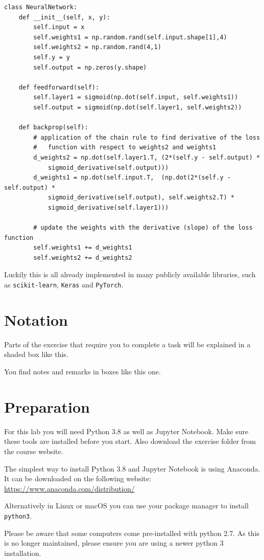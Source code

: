 \documentclass[parskip=half,notes,cadrem,toolver]{iisvlsi}
\begin{document}
\begin{lstlisting}
class NeuralNetwork:
    def __init__(self, x, y):
        self.input = x
        self.weights1 = np.random.rand(self.input.shape[1],4)
        self.weights2 = np.random.rand(4,1)
        self.y = y
        self.output = np.zeros(y.shape)
    
    def feedforward(self):
        self.layer1 = sigmoid(np.dot(self.input, self.weights1))
        self.output = sigmoid(np.dot(self.layer1, self.weights2))
        
    def backprop(self):
        # application of the chain rule to find derivative of the loss
        #   function with respect to weights2 and weights1
        d_weights2 = np.dot(self.layer1.T, (2*(self.y - self.output) *
            sigmoid_derivative(self.output)))
        d_weights1 = np.dot(self.input.T,  (np.dot(2*(self.y - self.output) * 
            sigmoid_derivative(self.output), self.weights2.T) * 
            sigmoid_derivative(self.layer1)))

        # update the weights with the derivative (slope) of the loss function
        self.weights1 += d_weights1
        self.weights2 += d_weights2
\end{lstlisting}

Luckily this is all already implemented in many publicly available libraries, such as \texttt{scikit-learn}, \texttt{Keras} and \texttt{PyTorch}.


\section{Notation}

\begin{studtask*}[]
Parts of the exercise that require you to complete a task will be explained in a shaded box like this.
\end{studtask*}
\begin{note*}
You find notes and remarks in boxes like this one.
\end{note*}

\section{Preparation} \label{sec:prep}

For this lab you will need Python 3.8 as well as Jupyter Notebook. Make sure these tools are installed before you start. Also download the exercise folder from the course website.
\pagebreak
\begin{note}
The simplest way to install Python 3.8 and Jupyter Notebook is using Anaconda. It can be downloaded on the following website: \url{https://www.anaconda.com/distribution/}

Alternatively in Linux or macOS you can use your package manager to install \texttt{python3}. 

Please be aware that some computers come pre-installed with python 2.7. As this is no longer maintained, please ensure you are using a newer python 3 installation.
\end{note}
\end{document}
